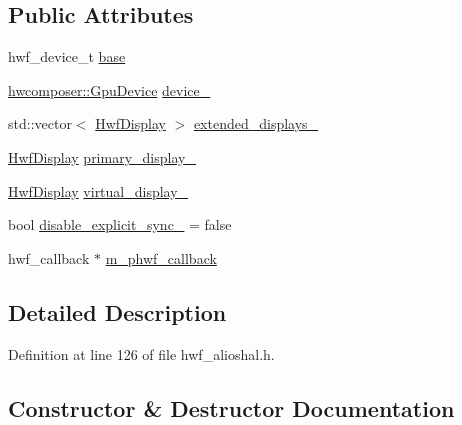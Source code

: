 \subsection*{Public Attributes}
\begin{DoxyCompactItemize}
\item 
hwf\+\_\+device\+\_\+t \mbox{\hyperlink{structhwcomposer_1_1HwfDevice_a44bf25fa996653bdd769356877474aae}{base}}
\item 
\mbox{\hyperlink{classhwcomposer_1_1GpuDevice}{hwcomposer\+::\+Gpu\+Device}} \mbox{\hyperlink{structhwcomposer_1_1HwfDevice_ac4ffa82a5663159ad68529ab7e09df5c}{device\+\_\+}}
\item 
std\+::vector$<$ \mbox{\hyperlink{structhwcomposer_1_1HwfDisplay}{Hwf\+Display}} $>$ \mbox{\hyperlink{structhwcomposer_1_1HwfDevice_a33ce7da50d06832599339852177db522}{extended\+\_\+displays\+\_\+}}
\item 
\mbox{\hyperlink{structhwcomposer_1_1HwfDisplay}{Hwf\+Display}} \mbox{\hyperlink{structhwcomposer_1_1HwfDevice_add5f0488c9457a804425aaaada99fbca}{primary\+\_\+display\+\_\+}}
\item 
\mbox{\hyperlink{structhwcomposer_1_1HwfDisplay}{Hwf\+Display}} \mbox{\hyperlink{structhwcomposer_1_1HwfDevice_aa60208853a0712082aeda933846564ba}{virtual\+\_\+display\+\_\+}}
\item 
bool \mbox{\hyperlink{structhwcomposer_1_1HwfDevice_ad6575f785289998ddeb31a33ec6af76b}{disable\+\_\+explicit\+\_\+sync\+\_\+}} = false
\item 
hwf\+\_\+callback $\ast$ \mbox{\hyperlink{structhwcomposer_1_1HwfDevice_a92b0a0567112606aa0a8324cc2c8c7b7}{m\+\_\+phwf\+\_\+callback}}
\end{DoxyCompactItemize}


\subsection{Detailed Description}


Definition at line 126 of file hwf\+\_\+alioshal.\+h.



\subsection{Constructor \& Destructor Documentation}
\mbox{\label{structhwcomposer_1_1HwfDevice_a027a1b50b40fbab4398e755956cfa416}} 
